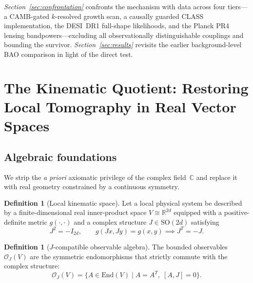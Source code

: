 \documentclass[aps,prd,twocolumn,superscriptaddress,nofootinbib]{revtex4-2}
\theoremstyle{definition}
\newtheorem{definition}[theorem]{Definition}
\theoremstyle{remark}
\newcommand{\R}{\mathbb{R}}
\newcommand{\C}{\mathbb{C}}
\newcommand{\OJ}{\mathcal{O}_J}
\begin{document}
\textit{Section~\ref{sec:confrontation}} confronts the mechanism with
data across four tiers---a CAMB-gated $k$-resolved growth scan, a
causally guarded CLASS implementation, the DESI~DR1 full-shape
likelihoods, and the Planck PR4 lensing bandpowers---excluding all
observationally distinguishable couplings and bounding the survivor.
\textit{Section~\ref{sec:results}} revisits the earlier background-level
BAO comparison in light of the direct test.


\section{The Kinematic Quotient: Restoring Local Tomography in Real Vector Spaces}
\label{sec:kinematic_quotient}

\subsection{Algebraic foundations}

We strip the \textit{a priori} axiomatic privilege of the complex
field~$\C$ and replace it with real geometry constrained by a continuous
symmetry.

\begin{definition}[Local kinematic space]
\label{def:local_kinematic}
Let a local physical system be described by a finite-dimensional real
inner-product space $V \cong \R^{2d}$ equipped with a positive-definite
metric $g(\cdot,\cdot)$ and a complex structure
$J \in \mathrm{SO}(2d)$ satisfying
\begin{equation}
J^2 = -I_{2d}, \qquad g(Jx, Jy) = g(x,y) \implies J^T = -J.
\label{eq:complex_structure}
\end{equation}
\end{definition}

\begin{definition}[$J$-compatible observable algebra]
\label{def:observable_algebra}
The bounded observables $\OJ(V)$ are the symmetric endomorphisms that
strictly commute with the complex structure:
\begin{equation}
\OJ(V) = \{ A \in \mathrm{End}(V) \mid A = A^T,\; [A, J] = 0 \}.
\label{eq:obs_algebra}
\end{equation}
\end{definition}
\end{document}
